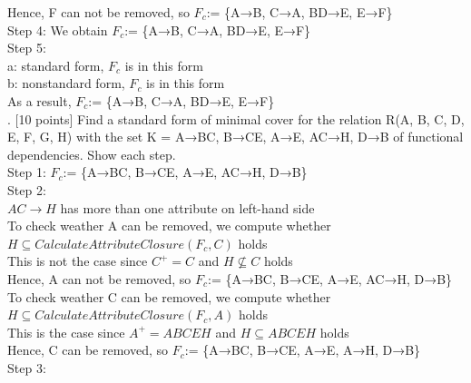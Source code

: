 \documentclass[]{article}
\begin{document}
	Hence, F can not be removed, so $F_{c}$:= \{A→B, C→A, BD→E, E→F\} \\
	
	\noindent Step 4: We obtain $F_{c}$:=  \{A→B, C→A, BD→E, E→F\} \\
	
	\noindent Step 5:  \\
	
	a: standard form, $F_{c}$ is in this form \\
	
	b: nonstandard form, $F_{c}$ is in this form \\
	
	\noindent As a result, $F_{c}$:=  \{A→B, C→A, BD→E, E→F\} \\
	
	. [10 points] Find a standard form of minimal cover for the relation R(A, B, C, D, E, F, G, H) with the set K = {A→BC, B→CE, A→E, AC→H, D→B} of functional dependencies. Show each step.    \\
	
	\noindent Step 1: $F_{c}$:= \{A→BC, B→CE, A→E, AC→H, D→B\}    \\
	
	\noindent Step 2: \\
	
	$AC\rightarrow H$ has more than one attribute on left-hand side\\
	
	To check weather A can be removed, we compute whether $H\subseteq CalculateAttributeClosure(F_{c}, C)$ holds \\
	
	This is not the case since $C^{+} = C$ and $H\not\subseteq C$ holds  \\
	
	Hence, A can not be removed, so $F_{c}$:= \{A→BC, B→CE, A→E, AC→H, D→B\} \\
	
	To check weather C can be removed, we compute whether $H\subseteq CalculateAttributeClosure(F_{c}, A)$ holds \\
	
	This is the case since $A^{+} = ABCEH$ and $H\subseteq ABCEH$ holds  \\
	
	Hence, C can be removed, so $F_{c}$:= \{A→BC, B→CE, A→E, A→H, D→B\} \\
	
	\noindent Step 3:  \\
	
\end{document}
